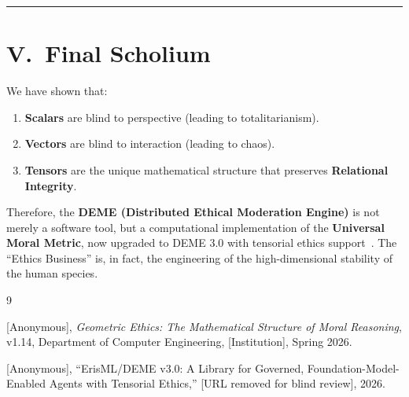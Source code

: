 \documentclass[12pt]{article}
\theoremstyle{remark}
\begin{document}
\bigskip
\hrule
\bigskip

\section*{V.\ Final Scholium}

We have shown that:

\begin{enumerate}
    \item \textbf{Scalars} are blind to perspective (leading to
    totalitarianism).

    \item \textbf{Vectors} are blind to interaction (leading to chaos).

    \item \textbf{Tensors} are the unique mathematical structure that preserves
    \textbf{Relational Integrity}.
\end{enumerate}

Therefore, the \textbf{DEME (Distributed Ethical Moderation Engine)} is not
merely a software tool, but a computational implementation of the
\textbf{Universal Moral Metric}, now upgraded to DEME 3.0 with tensorial ethics support~\cite{bond2026erisml}. The ``Ethics Business'' is, in fact, the
engineering of the high-dimensional stability of the human species.

\begin{thebibliography}{9}

[Anonymous], \emph{Geometric Ethics: The Mathematical Structure of Moral Reasoning}, v1.14, Department of Computer Engineering, [Institution], Spring 2026.

[Anonymous], ``ErisML/DEME v3.0: A Library for Governed, Foundation-Model-Enabled Agents with Tensorial Ethics,'' [URL removed for blind review], 2026.

\end{thebibliography}
\end{document}
